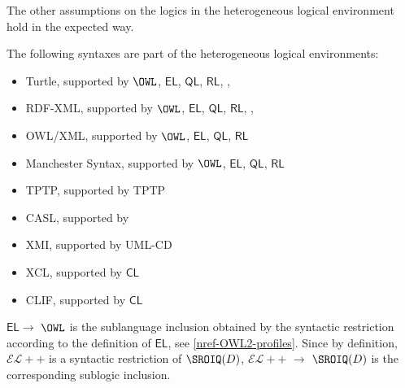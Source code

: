 \documentclass[10pt, a4paper]{isov2}
\newcommand*{\CL}{\ensuremath{\mathsf{CL}}\xspace}
\newcommand{\QL}{\ensuremath{\mathsf{QL}}\xspace}
\newcommand{\RL}{\ensuremath{\mathsf{RL}}\xspace}
\newcommand{\EL}{\ensuremath{\mathsf{EL}}\xspace}
\newcommand{\ELDL}{\ensuremath{\mathcal{EL}}\xspace}
\renewcommand{\noterefname}{note}
\renewcommand{\nref}[1]{\noterefname~\ref{#1}}
\renewcommand{\nref}[1]{\ref{nref-#1}}
\begin{document}
The other assumptions on the logics in the heterogeneous logical environment hold in
the expected way.




The following syntaxes are part of the heterogeneous logical environments:
\begin{itemize}
 \item Turtle, supported by $\OWL$, \EL, \QL, \RL , \RDF, \RDFS
 \item RDF-XML, supported by $\OWL$, \EL, \QL, \RL , \RDF, \RDFS
 \item OWL/XML, supported by $\OWL$, \EL, \QL, \RL 
 \item Manchester Syntax, supported by $\OWL$, \EL, \QL, \RL
  \item TPTP, supported by TPTP
  \item CASL, supported by \CASL
 \item XMI, supported by UML\mbox{-}CD
 \item XCL, supported by \CL
 \item CLIF, supported by \CL 
\end{itemize}





\ssclause{\EL $\to$ $\OWL$ and $\ELDL{+}{+}$ $\to$ $\SROIQ(D)$}

\EL $\to$ $\OWL$ is the sublanguage inclusion obtained by the
syntactic restriction according to the definition of \EL, see
\nref{OWL2-profiles}. Since by definition, $\ELDL{+}{+}$
is a syntactic restriction of $\SROIQ(D)$, $\ELDL{+}{+}$ $\to$ $\SROIQ(D)$
is the corresponding sublogic inclusion.

\end{document}
